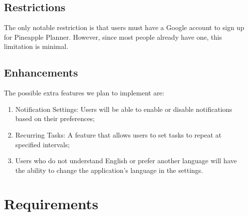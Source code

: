 \documentclass{article}
\begin{document}
\subsection{Restrictions}
The only notable restriction is that users must have a Google account to sign up for Pineapple Planner. However, since most people already have one, this limitation is minimal.
\subsection{Enhancements}


The possible extra features we plan to implement are:
\begin{enumerate}
  \item Notification Settings: Users will be able to enable or disable notifications based on their preferences;
  \item Recurring Tasks: A feature that allows users to set tasks to repeat at specified intervals;
  \item Users who do not understand English or prefer another language will have the ability to change the application's language in the settings.
\end{enumerate}


\section{Requirements}
\end{document}
